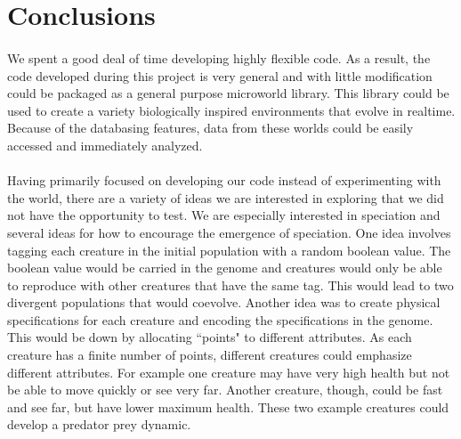 \documentclass[12pt]{report}
\begin{document}
\section*{Conclusions}
\paragraph{} 
We spent a good deal of time developing highly flexible code. As a result, the code developed during this project is very general and with little modification could be packaged as a general purpose microworld  library. This library could be used to create a variety biologically inspired environments that evolve in realtime. Because of the databasing features, data from these worlds could be easily accessed and immediately analyzed.  
\paragraph{} Having primarily focused on developing our code instead of experimenting with the world, there are a variety of ideas we are interested in exploring that we did not have the opportunity to test. We are especially interested in speciation and several ideas for how to encourage the emergence of speciation. One idea involves tagging each creature in the initial population with a random boolean value. The boolean value would be carried in the genome and creatures would only be able to reproduce with other creatures that have the same tag. This would lead to two divergent populations that would coevolve. Another idea was to create physical specifications for each creature and encoding the specifications in the genome. This would be down by allocating ``points" to different attributes. As each creature has a finite number of points, different creatures could emphasize different attributes. For example one creature may have very high health but not be able to move quickly or see very far. Another creature, though, could be fast and see far, but have lower maximum health. These two example creatures could develop a predator prey dynamic.
\end{document}
